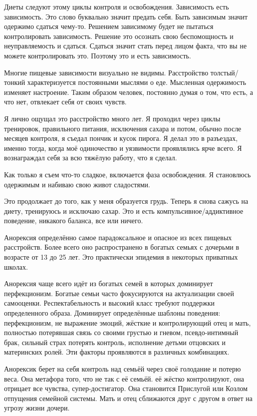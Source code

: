 \documentclass[10pt, fleqn]{article}
\begin{document}
Диеты следуют этому циклы контроля и освобождения. Зависимость есть зависимость. Это слово буквально значит предать себя. Быть зависимым значит одержимо сдаться чему-то. Решением зависимому будет не пытаться контролировать зависимость. Решение это осознать свою беспомощность и неуправляемость и сдаться. Сдаться значит стать перед лицом факта, что вы не можете контролировать это. Поэтому это и есть зависимость.


Многие пищевые зависимости визуально не видимы. Расстройство толстый/тонкий характеризуется постоянными мыслями о еде. Мысленная одержимость изменяет настроение. Таким образом человек, постоянно думая о том, что есть, а что нет, отвлекает себя от своих чувств.

Я лично ощущал это расстройство много лет. Я проходил через циклы тренировок, правильного питания, исключения сахара и потом, обычно после месяцев контроля, я съедал пончик и кусок пирога. Я делал это в разъездах, именно тогда, когда моё одиночество и уязвимости проявлялись ярче всего. Я вознаграждал себя за всю тяжёлую работу, что я сделал.

Как только я съем что-то сладкое, включается фаза освобождения. Я становлюсь одержимым и набиваю свою живот сладостями.

Это продолжает до того, как у меня образуется грудь. Теперь я снова сажусь на диету, тренируюсь и исключаю сахар. Это и есть компульсивное/аддиктивное поведение, никакого баланса, все или ничего.


Анорексия определённо самое парадоксальное и опасное из всех пищевых расстройств. Более всего оно распространено в богатых семьях с дочерьми в возрасте от 13 до 25 лет. Это практически эпидемия в некоторых приватных школах.

Анорексия чаще всего идёт из богатых семей в которых доминирует перфекционизм. Богатые семьи часто фокусируются на актуализации своей самооценки. Респектабельность и высокий класс требуют поддержки определенного образа. Доминирует определённые шаблоны поведения: перфекционизм, не выражение эмоций, жёсткие и контролирующий отец и мать, полностью потерявшая связь со своими грустью и гневом, псевдо-интимный брак, сильный страх потерять контроль, исполнение детьми отцовских и материнских ролей. Эти факторы проявляются в различных комбинациях.

Анорексик берет на себя контроль над семьёй через своё голодание и потерю веса. Она метафора того, что не так с её семьёй. её жёстко контролируют, она отрицает все чувства, супер-достигатор. Она становится Прислугой или Козлом отпущения семейной системы. Мать и отец сближаются друг с другом в ответ на угрозу жизни дочери.
\end{document}

